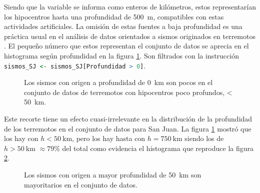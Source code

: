 \documentclass[a4paper]{report}
\begin{document}
Siendo que la variable se informa como enteros de kilómetros, estos representarían los hipocentros hasta una profundidad de \SI{500}{\metre}, compatibles con estas actividades artificiales.
La omisión de estas fuentes a baja profundidad es una práctica usual en el análisis de datos orientados a sismos originados en terremotos \cite{hu_applying_2024}.
El pequeño número que estos representan  el conjunto de datos se aprecia en el histograma según profundidad en la figura \ref{fig:histograma_profundidad50km}.
Son filtrados con la instrucción \lstinline[language = R]'sismos_SJ <- sismos_SJ[Profundidad > 0]'.
\begin{figure}[!ht]
	\centering
  \vspace{-1.5cm} %
	
  \vspace{-1cm} %
	\caption{Los sismos con origen a profundidad de \SI{0}{\kilo\metre} son pocos en el conjunto de datos de terremotos con hipocentros poco profundos, < \SI{50}{\kilo\metre}.}
	\label{fig:histograma_profundidad50km}
\end{figure}

Este recorte tiene un efecto cuasi-irrelevante en la distribución de la profundidad de los terremotos en el conjunto de datos para San Juan. 
La figura \ref{fig:histograma_profundidad50km} mostró que los hay con \(h < \SI{50}{\kilo\metre}\), pero los hay hasta con \(h= \SI{750}{\kilo\metre}\) siendo los de \(h > \SI{50}{\kilo\metre}\) \(\approx 79\%\) del total como evidencia el histograma que reproduce la figura \ref{fig:histograma_profundidad750km}.

\begin{figure}[!ht]
	\centering
  \vspace{-1.5cm} %
	
  \vspace{-1cm} %
	\caption{Los sismos con origen a mayor profundidad de \SI{50}{\kilo\metre} son mayoritarios en el conjunto de datos.}
	\label{fig:histograma_profundidad750km}
\end{figure}
\end{document}
